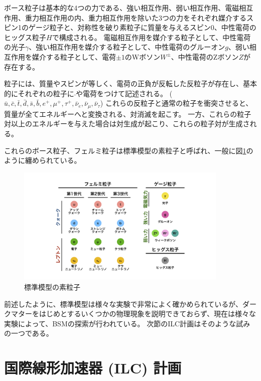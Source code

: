 ボース粒子は基本的な4つの力である、強い相互作用、弱い相互作用、電磁相互作用、重力相互作用の内、重力相互作用を除いた3つの力をそれぞれ媒介するスピン1のゲージ粒子と、対称性を破り素粒子に質量を与えるスピン0、中性電荷のヒッグス粒子$H$で構成される。
電磁相互作用を媒介する粒子として、中性電荷の光子$\gamma$、強い相互作用を媒介する粒子として、中性電荷のグルーオン$g$、弱い相互作用を媒介する粒子として、電荷$\pm 1$のWボソン$W^{\pm}$、中性電荷のZボソン$Z$が存在する。


粒子には、質量やスピンが等しく、電荷の正負が反転した反粒子が存在し、基本的にそれぞれの粒子に$\bar{}$や電荷をつけて記述される。 ($\bar{u}, \bar{c}, \bar{t}, \bar{d}, \bar{s}, \bar{b}, e^+, \mu^+, \tau^+, \bar{\nu}_{e}, \bar{\nu}_{\mu}, \bar{\nu}_{\tau}$)
これらの反粒子と通常の粒子を衝突させると、質量が全てエネルギーへと変換される、対消滅を起こす。
一方、これらの粒子対以上のエネルギーを与えた場合は対生成が起こり、これらの粒子対が生成される。

これらのボース粒子、フェルミ粒子は標準模型の素粒子と呼ばれ、一般に図\ref{1SMParticle}のように纏められている。

\begin{figure}[h]
 \centering
 \includegraphics[width=0.9\textwidth]{Figure/1Introduction/1SMParticle.png}
 \caption{標準模型の素粒子}
 \label{1SMParticle}
\end{figure}

前述したように、標準模型は様々な実験で非常によく確かめられているが、ダークマターをはじめとするいくつかの物理現象を説明できておらず、現在は様々な実験によって、BSMの探索が行われている。
次節のILC計画はそのような試みの一つである。

\section{国際線形加速器 (ILC) 計画} \label{Intro:InternationalLinearColliderProject}

